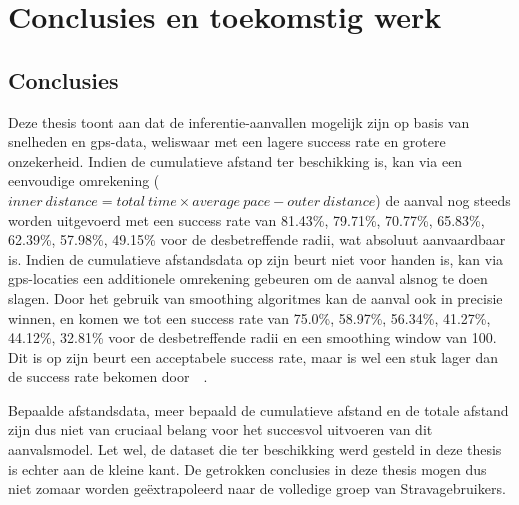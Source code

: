 \chapter{Conclusies en toekomstig werk}
\section{Conclusies}
Deze thesis toont aan dat de inferentie-aanvallen mogelijk zijn op basis van
snelheden en \ac{gps}-data, weliswaar met een lagere success rate en grotere
onzekerheid. Indien de cumulatieve afstand ter beschikking is, kan via een
eenvoudige omrekening ($inner\ distance = total\ time \times average\ pace -
      outer\ distance$) de aanval nog steeds worden uitgevoerd met een success rate
van 81.43\%, 79.71\%, 70.77\%, 65.83\%, 62.39\%, 57.98\%, 49.15\% voor de
desbetreffende radii, wat absoluut aanvaardbaar is. Indien de cumulatieve
afstandsdata op zijn beurt niet voor handen is, kan via \ac{gps}-locaties een
additionele omrekening gebeuren om de aanval alsnog te doen slagen. Door het
gebruik van smoothing algoritmes kan de aanval ook in precisie winnen, en komen
we tot een success rate van 75.0\%, 58.97\%, 56.34\%, 41.27\%, 44.12\%, 32.81\%
voor de desbetreffende radii en een smoothing window van 100. Dit is op zijn
beurt een acceptabele success rate, maar is wel een stuk lager dan de success
rate bekomen door~\citeauthor{Dhondt}~\cite{Dhondt}.

Bepaalde afstandsdata, meer bepaald de cumulatieve afstand en de totale afstand
zijn dus niet van cruciaal belang voor het succesvol uitvoeren van dit
aanvalsmodel. Let wel, de dataset die ter beschikking werd gesteld in deze
thesis is echter aan de kleine kant. De getrokken conclusies in deze thesis
mogen dus niet zomaar worden geëxtrapoleerd naar de volledige groep van
Stravagebruikers.

